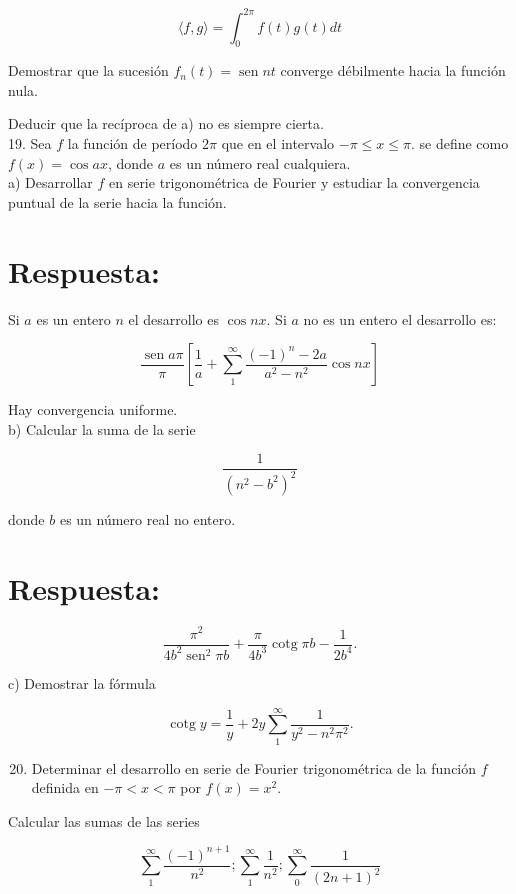 \documentclass[10pt]{article}
\theoremstyle{plain}
\theoremstyle{definition}
\theoremstyle{remark}
\begin{document}
$$
\langle f, g\rangle=\int_{0}^{2 \pi} f(t) g(t) d t
$$

Demostrar que la sucesión $f_{n}(t)=\operatorname{sen} n t$ converge débilmente hacia la función nula.

Deducir que la recíproca de a) no es siempre cierta.\\
19. Sea $f$ la función de período $2 \pi$ que en el intervalo $-\pi \leqslant x \leqslant \pi$. se define como $f(x)=\cos a x$, donde $a$ es un número real cualquiera.\\
a) Desarrollar $f$ en serie trigonométrica de Fourier y estudiar la convergencia puntual de la serie hacia la función.

\section*{Respuesta:}
Si $a$ es un entero $n$ el desarrollo es $\cos n x$. Si $a$ no es un entero el desarrollo es:

$$
\frac{\operatorname{sen} a \pi}{\pi}\left[\frac{1}{a}+\sum_{1}^{\infty} \frac{(-1)^{n}-2 a}{a^{2}-n^{2}} \cos n x\right]
$$

Hay convergencia uniforme.\\
b) Calcular la suma de la serie

$$
\frac{1}{\left(n^{2}-b^{2}\right)^{2}}
$$

donde $b$ es un número real no entero.

\section*{Respuesta:}
$$
\frac{\pi^{2}}{4 b^{2} \operatorname{sen}^{2} \pi b}+\frac{\pi}{4 b^{3}} \operatorname{cotg} \pi b-\frac{1}{2 b^{4}} .
$$

c) Demostrar la fórmula

$$
\operatorname{cotg} y=\frac{1}{y}+2 y \sum_{1}^{\infty} \frac{1}{y^{2}-n^{2} \pi^{2}} .
$$

\begin{enumerate}
  \setcounter{enumi}{19}
  \item Determinar el desarrollo en serie de Fourier trigonométrica de la función $f$ definida en $-\pi<x<\pi$ por $f(x)=x^{2}$.
\end{enumerate}

Calcular las sumas de las series

$$
\sum_{1}^{\infty} \frac{(-1)^{n+1}}{n^{2}} ; \sum_{1}^{\infty} \frac{1}{n^{2}} ; \sum_{0}^{\infty} \frac{1}{(2 n+1)^{2}}
$$
\end{document}
